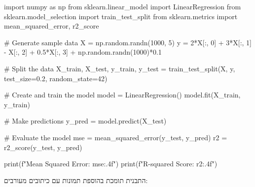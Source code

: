 \documentclass{hebrew-academic-template}
\begin{document}
\begin{pythonbox}
import numpy as np
from sklearn.linear_model import LinearRegression
from sklearn.model_selection import train_test_split
from sklearn.metrics import mean_squared_error, r2_score

# Generate sample data
X = np.random.randn(1000, 5)
y = 2*X[:, 0] + 3*X[:, 1] - X[:, 2] + 0.5*X[:, 3] + np.random.randn(1000)*0.1

# Split the data
X_train, X_test, y_train, y_test = train_test_split(X, y, test_size=0.2, random_state=42)

# Create and train the model
model = LinearRegression()
model.fit(X_train, y_train)

# Make predictions
y_pred = model.predict(X_test)

# Evaluate the model
mse = mean_squared_error(y_test, y_pred)
r2 = r2_score(y_test, y_pred)

print(f"Mean Squared Error: {mse:.4f}")
print(f"R-squared Score: {r2:.4f}")
\end{pythonbox}




התבנית תומכת בהוספת תמונות עם כיתובים מעורבים:




\end{document}
